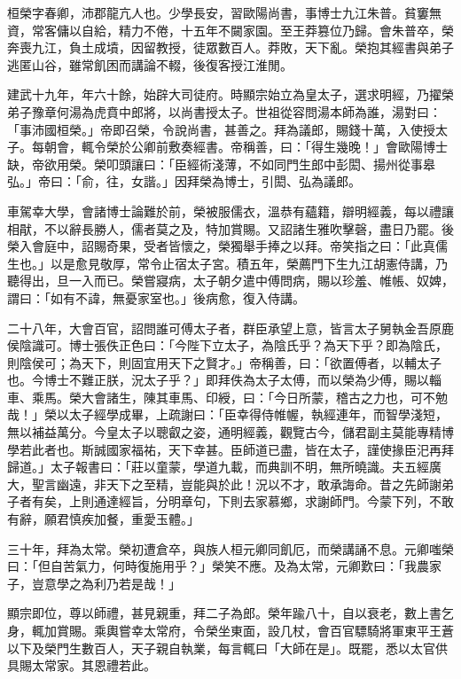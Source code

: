 
\begin{pinyinscope}
桓榮字春卿，沛郡龍亢人也。少學長安，習歐陽尚書，事博士九江朱普。貧窶無資，常客傭以自給，精力不倦，十五年不闚家園。至王莽篡位乃歸。會朱普卒，榮奔喪九江，負土成墳，因留教授，徒眾數百人。莽敗，天下亂。榮抱其經書與弟子逃匿山谷，雖常飢困而講論不輟，後復客授江淮閒。

建武十九年，年六十餘，始辟大司徒府。時顯宗始立為皇太子，選求明經，乃擢榮弟子豫章何湯為虎賁中郎將，以尚書授太子。世祖從容問湯本師為誰，湯對曰：「事沛國桓榮。」帝即召榮，令說尚書，甚善之。拜為議郎，賜錢十萬，入使授太子。每朝會，輒令榮於公卿前敷奏經書。帝稱善，曰：「得生幾晚！」會歐陽博士缺，帝欲用榮。榮叩頭讓曰：「臣經術淺薄，不如同門生郎中彭閎、揚州從事皋弘。」帝曰：「俞，往，女諧。」因拜榮為博士，引閎、弘為議郎。

車駕幸大學，會諸博士論難於前，榮被服儒衣，溫恭有蘊籍，辯明經義，每以禮讓相猒，不以辭長勝人，儒者莫之及，特加賞賜。又詔諸生雅吹擊磬，盡日乃罷。後榮入會庭中，詔賜奇果，受者皆懷之，榮獨舉手捧之以拜。帝笑指之曰：「此真儒生也。」以是愈見敬厚，常令止宿太子宮。積五年，榮薦門下生九江胡憲侍講，乃聽得出，旦一入而已。榮嘗寢病，太子朝夕遣中傅問病，賜以珍羞、帷帳、奴婢，謂曰：「如有不諱，無憂家室也。」後病愈，復入侍講。

二十八年，大會百官，詔問誰可傅太子者，群臣承望上意，皆言太子舅執金吾原鹿侯陰識可。博士張佚正色曰：「今陛下立太子，為陰氏乎？為天下乎？即為陰氏，則陰侯可；為天下，則固宜用天下之賢才。」帝稱善，曰：「欲置傅者，以輔太子也。今博士不難正朕，況太子乎？」即拜佚為太子太傅，而以榮為少傅，賜以輜車、乘馬。榮大會諸生，陳其車馬、印綬，曰：「今日所蒙，稽古之力也，可不勉哉！」榮以太子經學成畢，上疏謝曰：「臣幸得侍帷幄，執經連年，而智學淺短，無以補益萬分。今皇太子以聰叡之姿，通明經義，觀覽古今，儲君副主莫能專精博學若此者也。斯誠國家福祐，天下幸甚。臣師道已盡，皆在太子，謹使掾臣汜再拜歸道。」太子報書曰：「莊以童蒙，學道九載，而典訓不明，無所曉識。夫五經廣大，聖言幽遠，非天下之至精，豈能與於此！況以不才，敢承誨命。昔之先師謝弟子者有矣，上則通達經旨，分明章句，下則去家慕鄉，求謝師門。今蒙下列，不敢有辭，願君慎疾加餐，重愛玉體。」

三十年，拜為太常。榮初遭倉卒，與族人桓元卿同飢厄，而榮講誦不息。元卿嗤榮曰：「但自苦氣力，何時復施用乎？」榮笑不應。及為太常，元卿歎曰：「我農家子，豈意學之為利乃若是哉！」

顯宗即位，尊以師禮，甚見親重，拜二子為郎。榮年踰八十，自以衰老，數上書乞身，輒加賞賜。乘輿嘗幸太常府，令榮坐東面，設几杖，會百官驃騎將軍東平王蒼以下及榮門生數百人，天子親自執業，每言輒曰「大師在是」。既罷，悉以太官供具賜太常家。其恩禮若此。


\end{pinyinscope}
